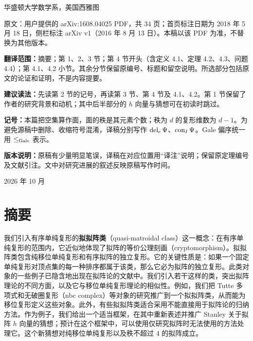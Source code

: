 \def\shorttitle{Samper：有序单纯复形的拟拟阵类}

\begin{titlepage}\centering
\vspace*{20mm}{\LARGE 有序单纯复形的拟拟阵类\par}
\vspace{6mm}{\large Quasi-matroidal classes of ordered simplicial complexes\par}
\vspace{10mm}{\Large José Alejandro Samper\par}
\vspace{4mm}华盛顿大学数学系，美国西雅图\par
\vspace{12mm}{\Large 中文分节选译\par}
\vspace{10mm}\begin{minipage}{.87\textwidth}
原文：用户提供的 arXiv:1608.04025 PDF，共 34 页；首页标注日期为 2018 年 5 月 18 日，侧栏标注 arXiv v1（2016 年 8 月 13 日）。本稿以该 PDF 为准，不替换为其他版本。

\textbf{翻译范围：}摘要；第 1、2、3 节；第 4 节开头（含定义 4.1、定理 4.2、4.3、问题 4.4）；第 4.1、4.2 小节。其余分节保留原编号、标题和留空说明。所选部分包括原文的论证和证明，不是内容提要。

\textbf{建议读法：}先读第 2 节的记号，再读第 3 节、第 4 节及 4.1、4.2。第 1 节保留了作者的研究背景和动机；其中后半部分的 $h$ 向量与猜想可在初读时跳过。

\textbf{记号：}本篇把空集算作面，面的秩是其元素个数；秩为 $d$ 的复形维数为 $d-1$。为避免源稿中删除、收缩符号混淆，译稿分别写作 $\operatorname{del}_e\Psi$、$\operatorname{con}_I\Psi$。Gale 偏序统一用 $\le_{\mathrm{Gale}}$ 表示。

\textbf{版本说明：}原稿有少量明显笔误，译稿在对应位置用“译注”说明；保留原定理编号及文献引注。文中对研究进展的叙述反映原稿写作时间。
\end{minipage}\vfill 2026 年 10 月\par
\end{titlepage}
\tableofcontents\newpage
\section*{摘要}
我们引入有序单纯复形的\textbf{拟拟阵类}（quasi-matroidal class）这一概念：在有序单纯复形的范围内，它近似地体现了拟阵的等价公理刻画（cryptomorphism）。拟拟阵类包含纯移位单纯复形和有序拟阵的独立复形。它的关键性质是：如果一个固定单纯复形对顶点集的每一种排序都属于该类，那么它必为拟阵的独立复形。此类对象的一些例子已隐含地出现在拟阵论的文献中。我们引入若干这样的类，突出拟阵理论的不同方面，以及它与移位单纯复形理论的相似性。例如，我们把 Tutte 多项式和无破圈复形（nbc complex）等对象的研究推广到一个拟拟阵类，从而能为移位复形定义这些对象。此外，有些拟拟阵类适合采用不能直接用于拟阵论的归纳方法。作为例子，我们给出一个适当框架，在其中重新表述并推广 Stanley 关于拟阵 $h$ 向量的猜想；预计在这个框架中，可以使用仅研究拟阵时无法使用的方法处理它。这个新猜想对纯移位单纯复形以及秩不超过 4 的拟阵成立。

